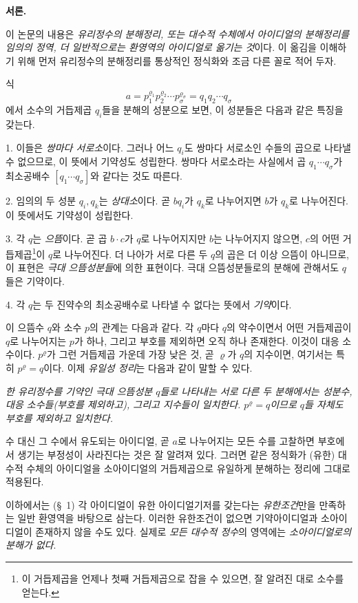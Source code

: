 \begin{center}\textbf{서론.}\end{center}
이 논문의 내용은 \emph{유리정수의 분해정리, 또는 대수적 수체에서 아이디얼의 분해정리를 임의의 정역, 더 일반적으로는 환영역의 아이디얼로 옮기는 것}이다. 이 옮김을 이해하기 위해 먼저 유리정수의 분해정리를 통상적인 정식화와 조금 다른 꼴로 적어 두자.

식
\[
 a=p_1^{\varrho_1}p_2^{\varrho_2}\cdots p_\sigma^{\varrho_\sigma}=q_1q_2\cdots q_\sigma
\]
에서 소수의 거듭제곱 $q_i$들을 분해의 성분으로 보면, 이 성분들은 다음과 같은 특징을 갖는다.

1. 이들은 \emph{쌍마다 서로소}이다. 그러나 어느 $q_i$도 쌍마다 서로소인 수들의 곱으로 나타낼 수 없으므로, 이 뜻에서 기약성도 성립한다. 쌍마다 서로소라는 사실에서 곱 $q_1\cdots q_\sigma$가 최소공배수 $[q_1\cdots q_\sigma]$와 같다는 것도 따른다.

2. 임의의 두 성분 $q_i,q_k$는 \emph{상대소}이다. 곧 $bq_i$가 $q_k$로 나누어지면 $b$가 $q_k$로 나누어진다. 이 뜻에서도 기약성이 성립한다.

3. 각 $q$는 \emph{으뜸}이다. 곧 곱 $b\cdot c$가 $q$로 나누어지지만 $b$는 나누어지지 않으면, $c$의 어떤 거듭제곱\footnote{이 거듭제곱을 언제나 첫째 거듭제곱으로 잡을 수 있으면, 잘 알려진 대로 소수를 얻는다.}이 $q$로 나누어진다. 더 나아가 서로 다른 두 $q$의 곱은 더 이상 으뜸이 아니므로, 이 표현은 \emph{극대 으뜸성분들}에 의한 표현이다. 극대 으뜸성분들로의 분해에 관해서도 $q$들은 기약이다.

4. 각 $q$는 두 진약수의 최소공배수로 나타낼 수 없다는 뜻에서 \emph{기약}이다.

이 으뜸수 $q$와 소수 $p$의 관계는 다음과 같다. 각 $q$마다 $q$의 약수이면서 어떤 거듭제곱이 $q$로 나누어지는 $p$가 하나, 그리고 부호를 제외하면 오직 하나 존재한다. 이것이 대응 소수이다. $p^\varrho$가 그런 거듭제곱 가운데 가장 낮은 것, 곧 $\varrho$가 $q$의 지수이면, 여기서는 특히 $p^\varrho=q$이다. 이제 \emph{유일성 정리}는 다음과 같이 말할 수 있다.

\emph{한 유리정수를 기약인 극대 으뜸성분 $q$들로 나타내는 서로 다른 두 분해에서는 성분수, 대응 소수들(부호를 제외하고), 그리고 지수들이 일치한다. $p^\varrho=q$이므로 $q$들 자체도 부호를 제외하고 일치한다.}

수 대신 그 수에서 유도되는 아이디얼, 곧 $a$로 나누어지는 모든 수를 고찰하면 부호에서 생기는 부정성이 사라진다는 것은 잘 알려져 있다. 그러면 같은 정식화가 (유한) 대수적 수체의 아이디얼을 소아이디얼의 거듭제곱으로 유일하게 분해하는 정리에 그대로 적용된다.

이하에서는 (\S~1) 각 아이디얼이 유한 아이디얼기저를 갖는다는 \emph{유한조건}만을 만족하는 일반 환영역을 바탕으로 삼는다. 이러한 유한조건이 없으면 기약아이디얼과 소아이디얼이 존재하지 않을 수도 있다. 실제로 \emph{모든 대수적 정수}의 영역에는 \emph{소아이디얼로의 분해가 없다}.

